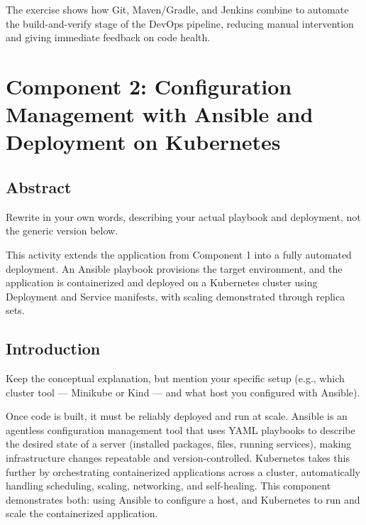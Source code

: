 \documentclass[12pt,a4paper]{article}
\begin{document}
The exercise shows how Git, Maven/Gradle, and Jenkins combine to automate the build-and-verify stage of the DevOps pipeline, reducing manual intervention and giving immediate feedback on code health.

\newpage

\section*{Component 2: Configuration Management with Ansible and Deployment on Kubernetes}

\subsection*{Abstract}
\begin{studentnote}
Rewrite in your own words, describing your actual playbook and deployment, not the generic version below.
\end{studentnote}

This activity extends the application from Component 1 into a fully automated deployment. An Ansible playbook provisions the target environment, and the application is containerized and deployed on a Kubernetes cluster using Deployment and Service manifests, with scaling demonstrated through replica sets.

\subsection*{Introduction}
\begin{studentnote}
Keep the conceptual explanation, but mention your specific setup (e.g., which cluster tool --- Minikube or Kind --- and what host you configured with Ansible).
\end{studentnote}

Once code is built, it must be reliably deployed and run at scale. Ansible is an agentless configuration management tool that uses YAML playbooks to describe the desired state of a server (installed packages, files, running services), making infrastructure changes repeatable and version-controlled. Kubernetes takes this further by orchestrating containerized applications across a cluster, automatically handling scheduling, scaling, networking, and self-healing. This component demonstrates both: using Ansible to configure a host, and Kubernetes to run and scale the containerized application.
\end{document}
